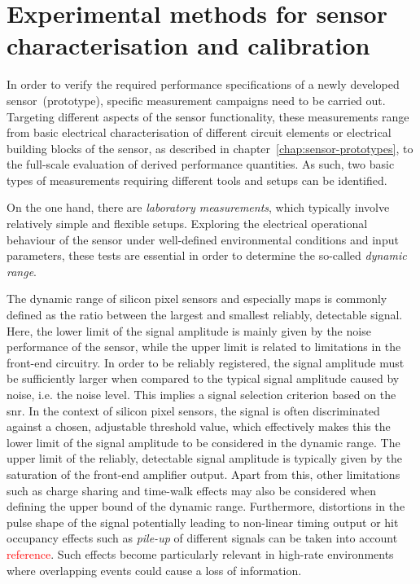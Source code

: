 %
\chapter{Experimental methods for sensor characterisation and calibration}
\label{chap:experimental-methods}
%
In order to verify the required performance specifications of a newly developed sensor~(prototype), specific measurement campaigns need to be carried out. 
Targeting different aspects of the sensor functionality, these measurements range from basic electrical characterisation of different circuit elements or electrical building blocks of the sensor, as described in chapter~\ref{chap:sensor-prototypes}, to the full-scale evaluation of derived performance quantities. 
As such, two basic types of measurements requiring different tools and setups can be identified.

On the one hand, there are \emph{laboratory measurements}, which typically involve relatively simple and flexible setups. 
Exploring the electrical operational behaviour of the sensor under well-defined environmental conditions and input parameters, these tests are essential in order to determine the so-called \emph{dynamic range}. 

The dynamic range of silicon pixel sensors and especially \gls{maps} is commonly defined as the ratio between the largest and smallest reliably, detectable signal. 
Here, the lower limit of the signal amplitude is mainly given by the noise performance of the sensor, while the upper limit is related to limitations in the front-end circuitry. 
In order to be reliably registered, the signal amplitude must be sufficiently larger when compared to the typical signal amplitude caused by noise, i.e. the noise level. 
This implies a signal selection criterion based on the \gls{snr}. 
In the context of silicon pixel sensors, the signal is often discriminated against a chosen, adjustable threshold value, which effectively makes this the lower limit of the signal amplitude to be considered in the dynamic range. 
The upper limit of the reliably, detectable signal amplitude is typically given by the saturation of the front-end amplifier output. 
Apart from this, other limitations such as charge sharing and time-walk effects may also be considered when defining the upper bound of the dynamic range. 
Furthermore, distortions in the pulse shape of the signal potentially leading to non-linear timing output or hit occupancy effects such as \emph{pile-up} of different signals can be taken into account \textcolor{red}{reference}. 
Such effects become particularly relevant in high-rate environments where overlapping events could cause a loss of information. 

